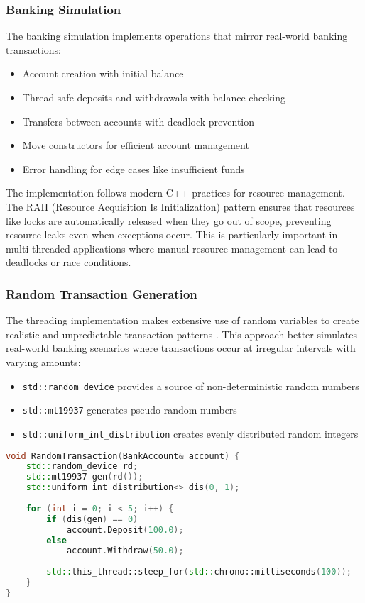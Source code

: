 \documentclass[12pt]{article}
\begin{document}
\subsubsection{Banking Simulation}
The banking simulation implements operations that mirror real-world banking transactions:
\begin{itemize}
    \item Account creation with initial balance
    \item Thread-safe deposits and withdrawals with balance checking
    \item Transfers between accounts with deadlock prevention
    \item Move constructors for efficient account management \cite{move_constructors}
    \item Error handling for edge cases like insufficient funds
\end{itemize}

The implementation follows modern C++ practices for resource management. The RAII (Resource Acquisition Is Initialization) pattern \cite{cpp_raii} ensures that resources like locks are automatically released when they go out of scope, preventing resource leaks even when exceptions occur. This is particularly important in multi-threaded applications where manual resource management can lead to deadlocks or race conditions.

\subsubsection{Random Transaction Generation}
The threading implementation makes extensive use of random variables to create realistic and unpredictable transaction patterns \cite{cpp_random}. This approach better simulates real-world banking scenarios where transactions occur at irregular intervals with varying amounts:

\begin{itemize}
    \item \texttt{std::random\_device} provides a source of non-deterministic random numbers
    \item \texttt{std::mt19937} generates pseudo-random numbers
    \item \texttt{std::uniform\_int\_distribution} creates evenly distributed random integers
\end{itemize}

\begin{lstlisting}[language=C++, caption=Random Transaction Generation]
void RandomTransaction(BankAccount& account) {
    std::random_device rd;
    std::mt19937 gen(rd());
    std::uniform_int_distribution<> dis(0, 1);
    
    for (int i = 0; i < 5; i++) {
        if (dis(gen) == 0)
            account.Deposit(100.0);
        else
            account.Withdraw(50.0);
        
        std::this_thread::sleep_for(std::chrono::milliseconds(100));
    }
}
\end{lstlisting}
\end{document}
